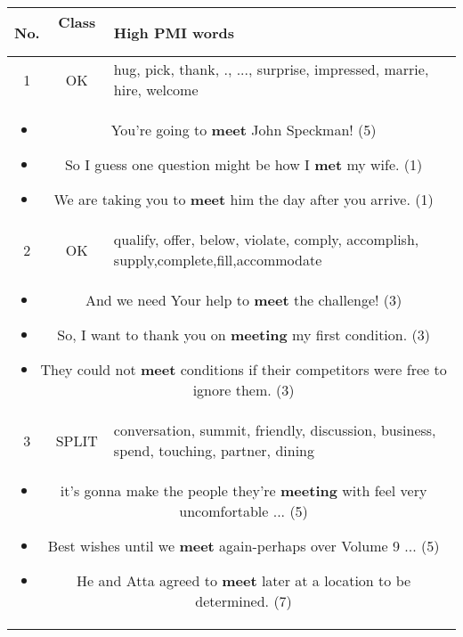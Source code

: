 \documentclass[11pt,a4paper]{article}
\begin{document}
\begin{table*}[htp!]
\centering
\begin{tabularx}{\linewidth}{| c |  c| X | }
	\hline
	\textbf{No.} & \textbf{Class} \ & \textbf{High PMI words} \\ \hline \hline 
    1 & OK &  hug, pick, thank, ., ..., surprise, impressed, marrie, hire, welcome \\ \hline
    \multicolumn{3}{|p{0.92\linewidth}|}{
    \begin{itemize}[topsep=0pt,itemsep=0pt,partopsep=0pt, parsep=0pt, rightmargin=0pt]
        \item You're going to {\bf meet} John Speckman! (5)
        \item So I guess one question might be how I {\bf met}
  my wife. (1)
      \item We are taking you to {\bf meet} him the day after you arrive. (1)
    \end{itemize}
  } \\
  \hline\hline
  2  & OK & qualify, offer, below, violate, comply, accomplish, supply,complete,fill,accommodate\\ \hline
    \multicolumn{3}{|p{0.92\linewidth}|}{
    \begin{itemize}[topsep=0pt,itemsep=0pt, parsep=0pt]
        \item And we need Your help to {\bf meet} the challenge! (3)
        \item So, I want to thank you on {\bf meeting} my first condition. (3)
      \item They could not {\bf meet} conditions if their competitors were free to ignore them. (3)
    \end{itemize}
  }\\
  \hline\hline
    3 & SPLIT & conversation, summit, friendly, discussion, business, spend, touching, partner, dining \\ \hline
    \multicolumn{3}{|p{0.92\linewidth}|}{
    \begin{itemize}[topsep=0pt,itemsep=0pt, parsep=0pt]
        \item it's gonna make the people they're {\bf meeting} with feel very uncomfortable ... (5)
        \item Best wishes until we {\bf meet} again-perhaps over Volume 9 ... (5)
      \item He and Atta agreed to {\bf meet} later at a location to be determined. (7)
    \end{itemize}
  }\\
  \hline\hline

\end{tabularx}
\end{table*}
\end{document}
